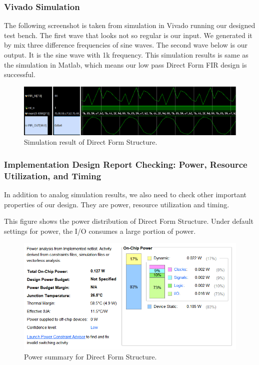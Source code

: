 \documentclass[a4paper]{article}
\begin{document}
\subsubsection{Vivado Simulation}
The following screenshot is taken from simulation in Vivado running our designed test bench. The first wave that looks not so regular is our input. We generated it by mix three difference frequencies of sine waves. The second wave below is our output. It is the sine wave with 1k frequency. This simulation results is same as the simulation in Matlab, which means our low pass Direct Form FIR design is successful.
\begin{figure}[H]
    \centering
    \includegraphics[width=1\textwidth]{siyuan/Direct simulation.png}
    \caption{Simulation result of Direct Form Structure.}
\end{figure}

\subsubsection{Implementation Design Report Checking: Power, Resource Utilization, and Timing}
In addition to analog simulation results, we also need to check other important properties of our design. They are power, resource utilization and timing.

This figure shows the power distribution of Direct Form Structure. Under default settings for power, the I/O consumes a large portion of power. 
\begin{figure}[H]
    \centering
    \includegraphics[width=1\textwidth]{siyuan/Direct power.png}
    \caption{Power summary for Direct Form Structure.}
\end{figure}
\end{document}
